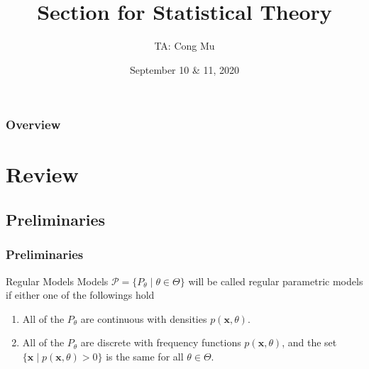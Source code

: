 \documentclass[serif,mathserif,professionalfont]{beamer}
\title[Section for EN.553.730]{Section for Statistical Theory} %
\author{TA: Cong Mu} %
\institute[cmu2@jhu.edu] %
{
Office Hour: Wednesday 09:30AM - 11:30AM
\medskip
\textit{} %
}
\date{September 10 \& 11, 2020} %
\begin{document}
\begin{frame}
\titlepage %
\end{frame}

\begin{frame}
\frametitle{Overview} %
\tableofcontents %
\end{frame}




\section{Review}



\subsection{Preliminaries}

\begin{frame}
	
	\frametitle{Preliminaries}
	
	\begin{block}{Regular Models}
		Models $ \mathcal{P} = \{P_{\theta} \; | \; \theta \in \Theta \} $ will be called regular parametric models if either one of the followings hold
		\begin{enumerate}
			\item All of the $ P_{\theta} $ are continuous with densities $ p \left(\bm{x}, \theta \right) $.
			\item All of the $ P_{\theta} $ are discrete with frequency functions $ p \left(\bm{x}, \theta \right) $, and the set $ \{\bm{x} \; | \; p \left(\bm{x}, \theta \right) > 0 \} $ is the same for all $ \theta \in \Theta $.
		\end{enumerate}
	\end{block}
	
\end{frame}
\end{document}
